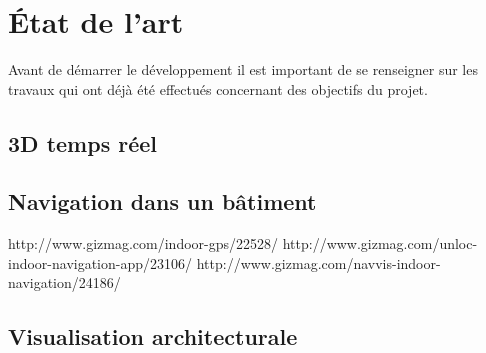 \section{État de l'art}
Avant de démarrer le développement il est important de se renseigner sur les travaux qui ont déjà été effectués concernant des objectifs du projet.
\subsection{3D temps réel}


\subsection{Navigation dans un bâtiment}
http://www.gizmag.com/indoor-gps/22528/
http://www.gizmag.com/unloc-indoor-navigation-app/23106/
http://www.gizmag.com/navvis-indoor-navigation/24186/
\subsection{Visualisation architecturale}